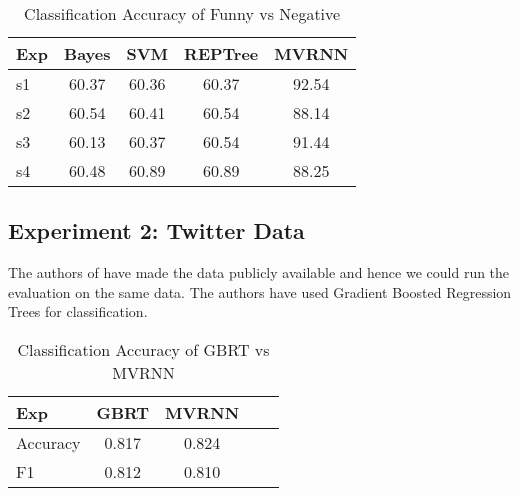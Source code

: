 \documentclass{acm_proc_article-sp}
\begin{document}
\begin{table}[t]
\caption{\label{}Classification Accuracy of Funny vs Negative }

\vspace{8pt} %

\centering
\begin{tabular}{|l |c |c| c| c|}
\hline%
Exp & Bayes & SVM & REPTree & MVRNN  \\
                 
\hline

s1 & 60.37 & 60.36 &60.37 & 92.54 \\
\hline
s2 & 60.54 & 60.41  &60.54 & 88.14 \\
\hline
s3 & 60.13 & 60.37 &60.54 & 91.44\\
\hline
s4 & 60.48 & 60.89 &60.89 & 88.25 \\
\hline



\end{tabular}
\end{table}


\subsection{Experiment 2: Twitter Data}

The authors of \cite{zhang2014recognizing} have made the data publicly available and hence we could run the evaluation on the same data. The authors have used Gradient Boosted Regression Trees for classification. 



\begin{table}[th]
\caption{\label{}Classification Accuracy of GBRT vs MVRNN  }

\vspace{8pt} %

\centering
\begin{tabular}{|l |c |c| c| c|}
\hline%
Exp &  GBRT &  MVRNN  \\
                 
\hline

Accuracy & 0.817 & 0.824 \\
\hline
F1 & 0.812 & 0.810 \\
\hline




\end{tabular}
\end{table}
\end{document}
